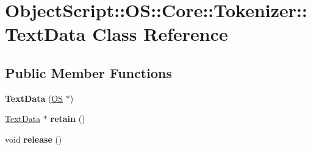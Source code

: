 \hypertarget{class_object_script_1_1_o_s_1_1_core_1_1_tokenizer_1_1_text_data}{}\section{Object\+Script\+:\+:OS\+:\+:Core\+:\+:Tokenizer\+:\+:Text\+Data Class Reference}
\label{class_object_script_1_1_o_s_1_1_core_1_1_tokenizer_1_1_text_data}
\subsection*{Public Member Functions}
\begin{DoxyCompactItemize}
\item 
{\bfseries Text\+Data} (\hyperlink{class_object_script_1_1_o_s}{OS} $\ast$)\hypertarget{class_object_script_1_1_o_s_1_1_core_1_1_tokenizer_1_1_text_data_aecc215c4cec371048ee8c4777e6867c0}{}\label{class_object_script_1_1_o_s_1_1_core_1_1_tokenizer_1_1_text_data_aecc215c4cec371048ee8c4777e6867c0}

\item 
\hyperlink{class_object_script_1_1_o_s_1_1_core_1_1_tokenizer_1_1_text_data}{Text\+Data} $\ast$ {\bfseries retain} ()\hypertarget{class_object_script_1_1_o_s_1_1_core_1_1_tokenizer_1_1_text_data_a27f4d4bb0c69638284e79db98ea0071b}{}\label{class_object_script_1_1_o_s_1_1_core_1_1_tokenizer_1_1_text_data_a27f4d4bb0c69638284e79db98ea0071b}

\item 
void {\bfseries release} ()\hypertarget{class_object_script_1_1_o_s_1_1_core_1_1_tokenizer_1_1_text_data_aeee5e48184e48adac77b18c1c51fa994}{}\label{class_object_script_1_1_o_s_1_1_core_1_1_tokenizer_1_1_text_data_aeee5e48184e48adac77b18c1c51fa994}

\end{DoxyCompactItemize}
